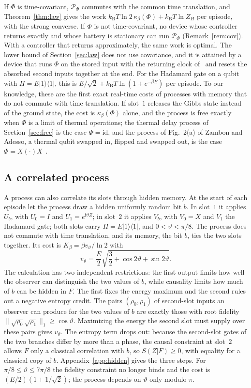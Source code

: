 \documentclass[11pt]{article}
\theoremstyle{definition}
\theoremstyle{remark}
\newcommand{\kB}{k_{\mathrm B}}
\newcommand{\Kb}{K_\beta}
\newcommand{\Trt}{\kappa_\beta}
\newcommand{\Pp}{\mathcal P}
\begin{document}
If $\Phi$ is time-covariant, $\Pp_\Phi$ commutes with the common time translation, and Theorem~\ref{thm:law} gives the work $\kB T\ln2\,\Trt(\Phi)+\kB T\ln Z_H$ per episode, with the strong converse. If $\Phi$ is not time-covariant, no device whose controller returns exactly and whose battery is stationary can run $\Pp_\Phi$ (Remark~\ref{rem:cov}). With a controller that returns approximately, the same work is optimal. The lower bound of Section~\ref{sec:law} does not use covariance, and it is attained by a device that runs $\Phi$ on the stored input with the returning clock of~\cite{SaveWork} and resets the absorbed second inputs together at the end. For the Hadamard gate on a qubit with $H=E|1\rangle\langle1|$, this is $E/\sqrt2+\kB T\ln(1+e^{-\beta E})$ per episode. To our knowledge, these are the first exact real-time costs of processes with memory that do not commute with time translation. If slot~$1$ releases the Gibbs state instead of the ground state, the cost is $\Trt(\Phi)$ alone, and the process is free exactly when $\Phi$ is a limit of thermal operations; the thermal delay process of Section~\ref{sec:free} is the case $\Phi=\mathrm{id}$, and the process of Fig.~2(a) of Zambon and Adesso, a thermal qubit swapped in, flipped and swapped out, is the case $\Phi=X(\cdot)X$~\cite{ZambonAdesso}.

\subsection{A correlated process}

A process can also correlate its slots through hidden memory. At the start of each episode let the process draw a hidden uniformly random bit $b$. In slot~$1$ it applies $U_b$, with $U_0=I$ and $U_1=e^{\mathrm i\vartheta Z}$; in slot~$2$ it applies $V_b$, with $V_0=X$ and $V_1$ the Hadamard gate; both slots carry $H=E|1\rangle\langle1|$, and $0<\vartheta<\pi/8$. The process does not commute with time translation, and its memory, the bit $b$, ties the two slots together. Its cost is $\Kb=\beta v_\vartheta/\ln2$ with
\[
v_\vartheta=\frac E2\sqrt{\frac32+\cos2\vartheta+\sin2\vartheta}.
\]
The calculation has two independent restrictions: the first output limits how well the observer can distinguish the two values of $b$, while causality limits how much of $b$ can be hidden in $F$. The first fixes the energy maximum and the second rules out a negative entropy credit. The pairs $(\rho_0,\rho_1)$ of second-slot inputs an observer can produce for the two values of $b$ are exactly those with root fidelity $\|\sqrt{\rho_0}\sqrt{\rho_1}\|_1\ge\cos\vartheta$. Maximizing the energy the second slot must supply over these pairs gives $v_\vartheta$. The entropy term drops out: because the second-slot gates of the two branches differ by more than a phase, the causal constraint at slot~$2$ allows $F$ only a classical correlation with $b$, so $S(Z|F)\ge0$, with equality for a classical copy of $b$. Appendix~\ref{app:hidden} gives the three steps. For $\pi/8\le\vartheta\le7\pi/8$ the fidelity constraint no longer binds and the cost is $(E/2)(1+1/\sqrt2)$; the process depends on $\vartheta$ only modulo $\pi$.
\end{document}
